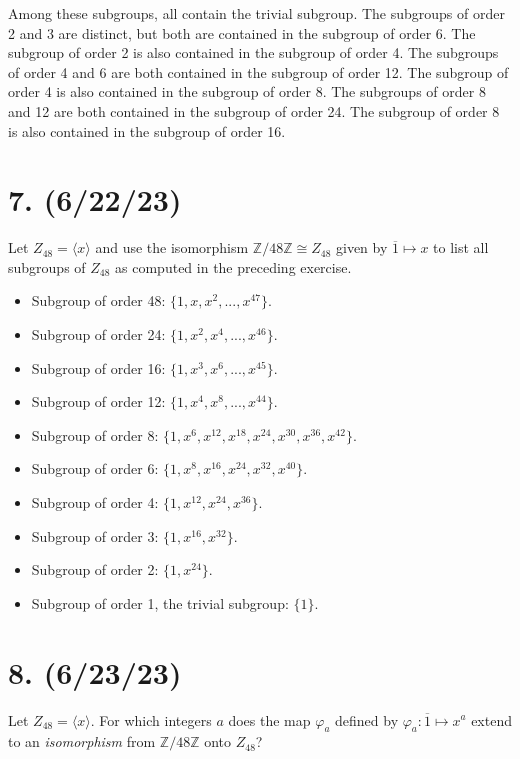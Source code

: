 \documentclass{article}
\begin{document}
Among these subgroups, all contain the trivial subgroup. The subgroups of order 2 and 3 are distinct, but both are contained in the subgroup of order 6. The subgroup of order 2 is also contained in the subgroup of order 4. The subgroups of order 4 and 6 are both contained in the subgroup of order 12. The subgroup of order 4 is also contained in the subgroup of order 8. The subgroups of order 8 and 12 are both contained in the subgroup of order 24. The subgroup of order 8 is also contained in the subgroup of order 16.

\section*{7. (6/22/23)}

Let $Z_{48} = \langle x \rangle$ and use the isomorphism $\mathbb{Z}/48\mathbb{Z} \cong Z_{48}$ given by $\overline{1} \mapsto x$ to list all subgroups of $Z_{48}$ as computed in the preceding exercise.

\begin{itemize}[itemsep=0em]
    \item Subgroup of order 48: $\{ 1, x, x^2, ..., x^{47} \}$.
    \item Subgroup of order 24: $\{ 1, x^2, x^4, ..., x^{46} \}$.
    \item Subgroup of order 16: $\{ 1, x^3, x^6, ..., x^{45} \}$.
    \item Subgroup of order 12: $\{ 1, x^4, x^8, ..., x^{44} \}$.
    \item Subgroup of order 8: $\{ 1, x^6, x^{12}, x^{18}, x^{24}, x^{30}, x^{36}, x^{42} \}$.
    \item Subgroup of order 6: $\{ 1, x^8, x^{16}, x^{24}, x^{32}, x^{40} \}$.
    \item Subgroup of order 4: $\{ 1, x^{12}, x^{24}, x^{36} \}$.
    \item Subgroup of order 3: $\{ 1, x^{16}, x^{32} \}$.
    \item Subgroup of order 2: $\{ 1, x^{24} \}$.
    \item Subgroup of order 1, the trivial subgroup: $\{ 1 \}$.
\end{itemize}

\section*{8. (6/23/23)}

Let $Z_{48} = \langle x \rangle$. For which integers $a$ does the map $\varphi_a$ defined by $\varphi_a: \overline{1} \mapsto x^a$ extend to an \emph{isomorphism} from $\mathbb{Z}/48\mathbb{Z}$ onto $Z_{48}$?
\end{document}
